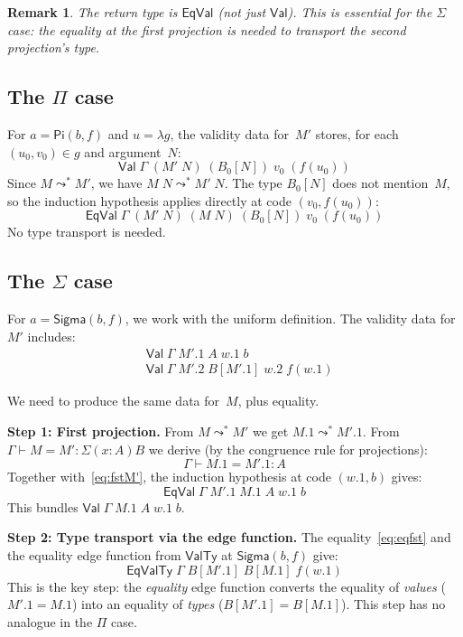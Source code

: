 \documentclass[11pt]{article}
\newcommand{\conveq}[4]{#1 \vdash #2 = #3 : #4}
\newcommand{\App}[2]{#1\;#2}
\newcommand{\substone}[2]{#1[#2]}
\newcommand{\PiC}[2]{\mathsf{Pi}(#1,#2)}
\newcommand{\SigmaC}[2]{\mathsf{Sigma}(#1,#2)}
\newcommand{\Red}{\mathrel{\leadsto^*}}
\newcommand{\Sigmatype}[2]{\Sigma(#1)#2}
\newcommand{\Val}{\mathsf{Val}}
\newcommand{\EqVal}{\mathsf{EqVal}}
\newcommand{\ValTy}{\mathsf{ValTy}}
\newcommand{\EqValTy}{\mathsf{EqValTy}}
\newcommand{\pj}[2]{#1\mbox{.}#2}
\newtheorem{remark}[theorem]{Remark}
\begin{document}
\begin{remark}
The return type is $\EqVal$ (not just $\Val$).  This is essential
for the $\Sigma$ case: the equality at the first projection is needed to
transport the second projection's type.
\end{remark}

\subsection{The $\Pi$ case}

For $a = \PiC{b}{f}$ and $u = \lambda g$, the validity data for~$M'$
stores, for each $(u_0, v_0) \in g$ and argument~$N$:
\[
  \Val\;\Gamma\;(\App{M'}{N})\;(\substone{B_0}{N})\;v_0\;(f(u_0))
\]
Since $M \Red M'$, we have $\App{M}{N} \Red \App{M'}{N}$.
The type $\substone{B_0}{N}$ does not mention~$M$, so the induction hypothesis
applies directly at code $(v_0, f(u_0))$:
\[
  \EqVal\;\Gamma\;(\App{M'}{N})\;(\App{M}{N})\;(\substone{B_0}{N})\;v_0\;(f(u_0))
\]
No type transport is needed.

\subsection{The $\Sigma$ case}\label{sec:sigma}

For $a = \SigmaC{b}{f}$, we work with the uniform definition.
The validity data for~$M'$ includes:
\begin{align}
  &\Val\;\Gamma\;\pj{M'}{1}\;A\;\pj{w}{1}\;b  \label{eq:fstM'}\\
  &\Val\;\Gamma\;\pj{M'}{2}\;\substone{B}{\pj{M'}{1}}\;\pj{w}{2}\;f(\pj{w}{1})
    \label{eq:sndM'}
\end{align}

We need to produce the same data for~$M$, plus equality.

\medskip
\noindent\textbf{Step 1: First projection.}
From $M \Red M'$ we get $\pj{M}{1} \Red \pj{M'}{1}$.  From
$\conveq{\Gamma}{M}{M'}{\Sigmatype{x{:}A}{B}}$ we derive (by the congruence
rule for projections):
\[
  \conveq{\Gamma}{\pj{M}{1}}{\pj{M'}{1}}{A}
\]
Together with~\eqref{eq:fstM'}, the induction hypothesis at code
$(\pj{w}{1}, b)$ gives:
\begin{equation}\label{eq:eqfst}
  \EqVal\;\Gamma\;\pj{M'}{1}\;\pj{M}{1}\;A\;\pj{w}{1}\;b
\end{equation}
This bundles $\Val\;\Gamma\;\pj{M}{1}\;A\;\pj{w}{1}\;b$.

\medskip
\noindent\textbf{Step 2: Type transport via the edge function.}
The equality~\eqref{eq:eqfst} and the equality edge function from $\ValTy$ at
$\SigmaC{b}{f}$ give:
\begin{equation}\label{eq:eqty}
  \EqValTy\;\Gamma\;\substone{B}{\pj{M'}{1}}\;\substone{B}{\pj{M}{1}}\;f(\pj{w}{1})
\end{equation}
This is the key step: the \emph{equality} edge function converts the equality of
\emph{values} ($\pj{M'}{1} = \pj{M}{1}$) into an equality of \emph{types}
($\substone{B}{\pj{M'}{1}} = \substone{B}{\pj{M}{1}}$).  This step has no
analogue in the $\Pi$ case.
\end{document}
